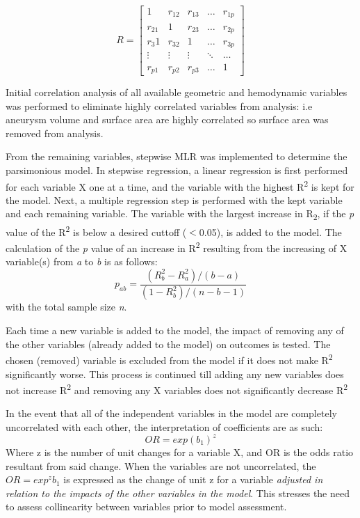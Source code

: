 \[
R = 
\begin{bmatrix}
    1       & r_{12} & r_{13} & \dots  & r_{1p} \\
    r_{21}  & 1      & r_{23} & \dots  & r_{2p} \\
    r_3{1}  & r_{32} & 1      & \dots  & r_{3p} \\
    \vdots  & \vdots & \vdots & \ddots & \dots  \\
    r_{p1}       & r_{p2}     & r_{p3} & \dots & 1
\end{bmatrix}
\]

Initial correlation analysis of all available geometric and hemodynamic variables was performed to eliminate highly correlated variables from analysis: i.e aneurysm volume and surface area are highly correlated so surface area was removed from analysis. 

From the remaining variables, stepwise MLR was implemented to determine the parsimonious model. In stepwise regression, a linear regression is first performed for each variable X one at a time, and the variable with the highest R\textsuperscript{2} is kept for the model. Next, a multiple regression step is performed with the kept variable and each remaining variable. The variable with the largest increase in R\textsubscript{2}, if the \textit{p} value of the R\textsuperscript{2} is below a desired cuttoff ($<$0.05), is added to the model. The calculation of the \textit{p} value of an increase in R\textsuperscript{2} resulting from the increasing of X variable(s) from \textit{a} to \textit{b} is as follows:
\begin{equation}
p_{ab} = \frac{(R^2 _b - R^2 _a)/(b-a)}{(1-R^2 _b) / (n-b-1)}
\end{equation}
with the total sample size \textit{n}.

Each time a new variable is added to the model, the impact of removing any of the other variables (already added to the model) on outcomes is tested. The chosen (removed) variable is excluded from the model if it does not make R\textsuperscript{2} significantly worse. This process is continued till adding any new variables does not increase R\textsuperscript{2} and removing any X variables does not significantly decrease R\textsuperscript{2}


In the event that all of the independent variables in the model are completely uncorrelated with each other, the interpretation of coefficients are as such:
\begin{equation}
OR = exp(b_1)^z
\end{equation}
Where z is the number of unit changes for a variable X, and OR is the odds ratio resultant from said change. When the variables are not uncorrelated, the $OR = exp^zb_1$ is expressed as the change of unit z for a variable \textit{adjusted in relation to the impacts of the other variables in the model}. This stresses the need to assess collinearity between variables prior to model assessment.



